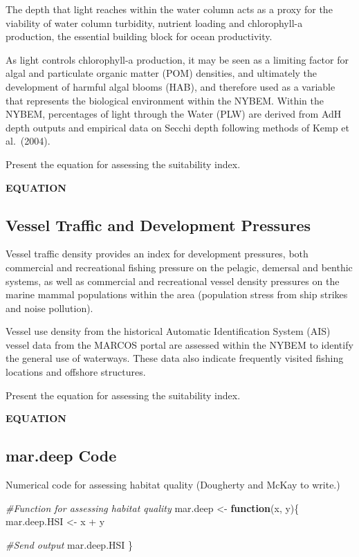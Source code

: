 \documentclass[
]{book}
\newenvironment{Shaded}{\begin{snugshade}}{\end{snugshade}}
\newcommand{\CommentTok}[1]{\textcolor[rgb]{0.56,0.35,0.01}{\textit{#1}}}
\newcommand{\ControlFlowTok}[1]{\textcolor[rgb]{0.13,0.29,0.53}{\textbf{#1}}}
\newcommand{\NormalTok}[1]{#1}
\newcommand{\OtherTok}[1]{\textcolor[rgb]{0.56,0.35,0.01}{#1}}
\newcommand{\SpecialCharTok}[1]{\textcolor[rgb]{0.00,0.00,0.00}{#1}}
\begin{document}
The depth that light reaches within the water column acts as a proxy for the viability of water column turbidity, nutrient loading and chlorophyll-a production, the essential building block for ocean productivity.

As light controls chlorophyll-a production, it may be seen as a limiting factor for algal and particulate organic matter (POM) densities, and ultimately the development of harmful algal blooms (HAB), and therefore used as a variable that represents the biological environment within the NYBEM.
Within the NYBEM, percentages of light through the Water (PLW) are derived from AdH depth outputs and empirical data on Secchi depth following methods of Kemp et al.~(2004).

Present the equation for assessing the suitability index.

\textbf{EQUATION}

\hypertarget{vessel-traffic-and-development-pressures}{%
\subsection{Vessel Traffic and Development Pressures}\label{vessel-traffic-and-development-pressures}}

Vessel traffic density provides an index for development pressures, both commercial and recreational fishing pressure on the pelagic, demersal and benthic systems, as well as commercial and recreational vessel density pressures on the marine mammal populations within the area (population stress from ship strikes and noise pollution).

Vessel use density from the historical Automatic Identification System (AIS) vessel data from the MARCOS portal are assessed within the NYBEM to identify the general use of waterways. These data also indicate frequently visited fishing locations and offshore structures.

Present the equation for assessing the suitability index.

\textbf{EQUATION}

\hypertarget{mar.deep-code}{%
\subsection{mar.deep Code}\label{mar.deep-code}}

Numerical code for assessing habitat quality ({Dougherty and McKay to write.})

\begin{Shaded}
\begin{Highlighting}[]
\CommentTok{\#Function for assessing habitat quality}
\NormalTok{mar.deep }\OtherTok{\textless{}{-}} \ControlFlowTok{function}\NormalTok{(x, y)\{}
\NormalTok{  mar.deep.HSI }\OtherTok{\textless{}{-}}\NormalTok{ x }\SpecialCharTok{+}\NormalTok{ y}

  \CommentTok{\#Send output}
\NormalTok{  mar.deep.HSI}
\NormalTok{\}}
\end{Highlighting}
\end{Shaded}
\end{document}
